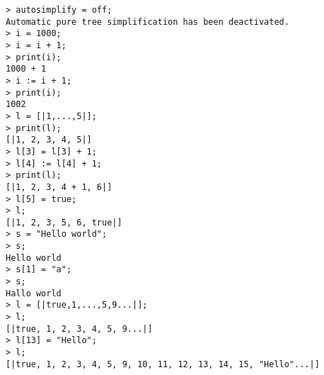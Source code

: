 \begin{center}\begin{minipage}{15cm}\begin{Verbatim}[frame=single]
> autosimplify = off;
Automatic pure tree simplification has been deactivated.
> i = 1000;
> i = i + 1;
> print(i);
1000 + 1
> i := i + 1;
> print(i);
1002
> l = [|1,...,5|];
> print(l);
[|1, 2, 3, 4, 5|]
> l[3] = l[3] + 1;
> l[4] := l[4] + 1;
> print(l);
[|1, 2, 3, 4 + 1, 6|]
> l[5] = true;
> l;
[|1, 2, 3, 5, 6, true|]
> s = "Hello world";
> s;
Hello world
> s[1] = "a";
> s;
Hallo world
> l = [|true,1,...,5,9...|];
> l;
[|true, 1, 2, 3, 4, 5, 9...|]
> l[13] = "Hello";
> l;
[|true, 1, 2, 3, 4, 5, 9, 10, 11, 12, 13, 14, 15, "Hello"...|]
\end{Verbatim}
\end{minipage}\end{center}
